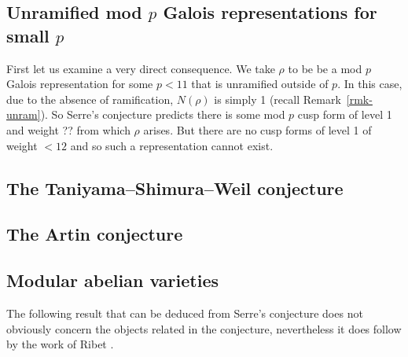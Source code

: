 \documentclass[a4paper,12pt]{article}
\begin{document}
\subsection{Unramified mod $p$ Galois representations for small $p$}
First let us examine a very direct consequence. %
We take $\rho$ to be be a mod $p$ Galois representation for some $p < 11$ that is unramified outside of $p$.
In this case, due to the absence of ramification, $N(\rho)$ is simply 1 (recall Remark~\ref{rmk-unram}). %
So Serre's conjecture predicts there is some mod $p$ cusp form of level 1 and weight ?? from which $\rho$ arises.
But there are no cusp forms of level 1 of weight $< 12$ and so such a representation cannot exist.


\subsection{The Taniyama--Shimura--Weil conjecture}


\subsection{The Artin conjecture}


\subsection{Modular abelian varieties}
The following result that can be deduced from Serre's conjecture does not obviously concern the objects related in the conjecture, nevertheless it does follow by the work of Ribet \cite{Ribet}.




\end{document}

